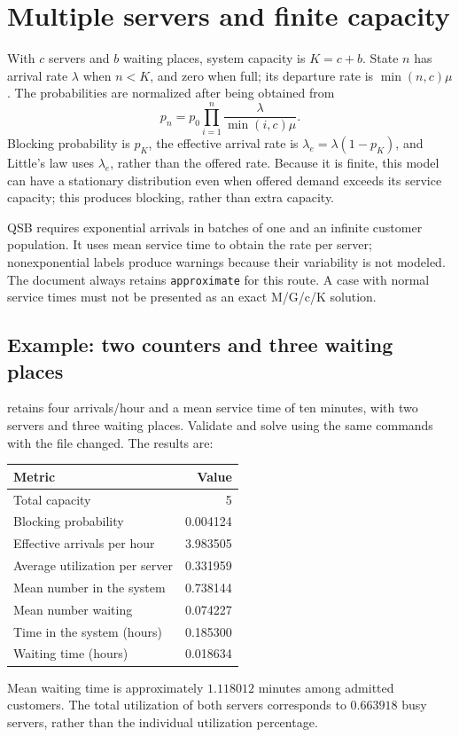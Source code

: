\section{Multiple servers and finite capacity}
With \(c\) servers and \(b\) waiting places, system capacity is \(K=c+b\).
State \(n\) has arrival rate \(\lambda\) when \(n<K\), and zero when
full; its departure rate is \(\min(n,c)\mu\).
The probabilities are normalized after being obtained from
\[
 p_n=p_0\prod_{i=1}^n\frac{\lambda}{\min(i,c)\mu}.
\]
Blocking probability is \(p_K\), the effective arrival rate
is \(\lambda_e=\lambda(1-p_K)\), and Little's law uses \(\lambda_e\),
rather than the offered rate. Because it is finite, this model can have a
stationary distribution even when offered demand exceeds its service capacity;
this produces blocking, rather than extra capacity.

QSB requires exponential arrivals in batches of one and an infinite customer population.
It uses mean service time to obtain the rate per server; nonexponential labels
produce warnings because their variability is not modeled. The document always
retains \texttt{approximate} for this route. A case with normal service times
must not be presented as an exact M/G/c/K solution.

\subsection{Example: two counters and three waiting places}
 retains four arrivals/hour and a mean service
time of ten minutes, with two servers and three waiting places. Validate and
solve using the same commands with the file changed. The results are:
\begin{center}
\begin{tabular}{lr}
\toprule
Metric & Value \\
\midrule
Total capacity & 5 \\
Blocking probability & 0.004124 \\
Effective arrivals per hour & 3.983505 \\
Average utilization per server & 0.331959 \\
Mean number in the system & 0.738144 \\
Mean number waiting & 0.074227 \\
Time in the system (hours) & 0.185300 \\
Waiting time (hours) & 0.018634 \\
\bottomrule
\end{tabular}
\end{center}
Mean waiting time is approximately \(1.118012\) minutes among admitted
customers. The total utilization of both servers corresponds to \(0.663918\)
busy servers, rather than the individual utilization percentage.

